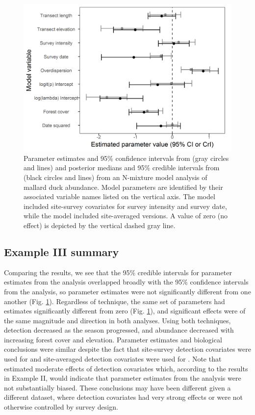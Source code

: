 \documentclass[codesnippet]{jss}
\begin{document}
\begin{figure}[p]
  \includegraphics[width=5in]{fig3.png}
  \caption{Parameter estimates and 95\% confidence intervals from  (gray circles and lines) and posterior medians and 95\% credible intervals from  (black circles and lines) from an N-mixture model analysis of mallard duck abundance. Model parameters are identified by their associated variable names listed on the vertical axis.  The  model included site-survey covariates for survey intensity and survey date, while the  model included site-averaged versions. A value of zero (no effect) is depicted by the vertical dashed gray line.}
  \label{fig:fig3}
\end{figure}

\subsection[Example III summary]{Example III summary}
Comparing the results, we see that the 95\% credible intervals for parameter estimates from the  analysis overlapped broadly with the 95\% confidence intervals from the  analysis, so parameter estimates were not significantly different from one another (Fig. \ref{fig:fig3}). Regardless of technique, the same set of parameters had estimates significantly different from zero (Fig. \ref{fig:fig3}), and significant effects were of the same magnitude and direction in both analyses. Using both techniques, detection decreased as the season progressed, and abundance decreased with increasing forest cover and elevation. Parameter estimates and biological conclusions were similar despite the fact that site-survey detection covariates were used for  and site-averaged detection covariates were used for . Note that  estimated moderate effects of detection covariates which, according to the results in Example II, would indicate that parameter estimates from the  analysis were not substantially biased. These conclusions may have been different given a different dataset, where detection covariates had very strong effects or were not otherwise controlled by survey design.
\end{document}
